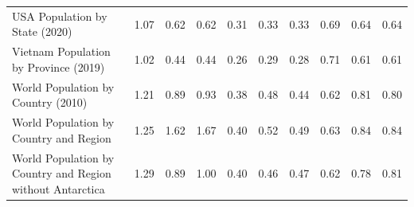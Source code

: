 \begin{tabular}{lccc|ccc|ccc}
                           USA Population by State (2020) &                      1.07 &                      0.62 &                         0.62 &                        0.31 &                        0.33 &                           0.33 &                          0.69 &                          0.64 &                             0.64 \\
                    Vietnam Population by Province (2019) &                      1.02 &                      0.44 &                         0.44 &                        0.26 &                        0.29 &                           0.28 &                          0.71 &                          0.61 &                             0.61 \\
                       World Population by Country (2010) &                      1.21 &                      0.89 &                         0.93 &                        0.38 &                        0.48 &                           0.44 &                          0.62 &                          0.81 &                             0.80 \\
                   World Population by Country and Region &                      1.25 &                      1.62 &                         1.67 &                        0.40 &                        0.52 &                           0.49 &                          0.63 &                          0.84 &                             0.84 \\
World Population by Country and Region without Antarctica &                      1.29 &                      0.89 &                         1.00 &                        0.40 &                        0.46 &                           0.47 &                          0.62 &                          0.78 &                             0.81 \\
\bottomrule
\end{tabular}
